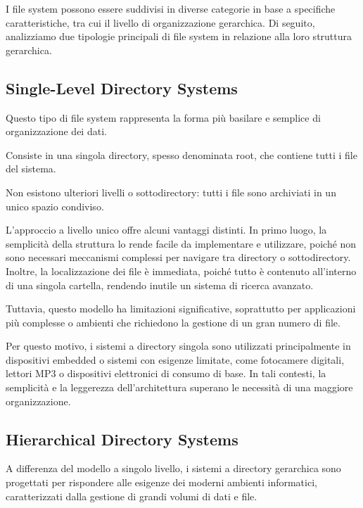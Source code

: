 \documentclass[12pt,a4paper,openright,twoside]{book}
\begin{document}
        I file system possono essere suddivisi in diverse categorie in base a specifiche caratteristiche, tra cui il livello di organizzazione gerarchica. Di seguito, analizziamo due tipologie principali di file system in relazione alla loro struttura gerarchica.

        \subsection{Single-Level Directory Systems}

            Questo tipo di file system rappresenta la forma più basilare e semplice di organizzazione dei dati.

            Consiste in una singola directory, spesso denominata root, che contiene tutti i file del sistema.

            Non esistono ulteriori livelli o sottodirectory: tutti i file sono archiviati in un unico spazio condiviso.

            L'approccio a livello unico offre alcuni vantaggi distinti. In primo luogo, la semplicità della struttura lo rende facile da implementare e utilizzare, poiché non sono necessari meccanismi complessi per navigare tra directory o sottodirectory. Inoltre, la localizzazione dei file è immediata, poiché tutto è contenuto all'interno di una singola cartella, rendendo inutile un sistema di ricerca avanzato.

            Tuttavia, questo modello ha limitazioni significative, soprattutto per applicazioni più complesse o ambienti che richiedono la gestione di un gran numero di file.

            Per questo motivo, i sistemi a directory singola sono utilizzati principalmente in dispositivi embedded o sistemi con esigenze limitate, come fotocamere digitali, lettori MP3 o dispositivi elettronici di consumo di base. In tali contesti, la semplicità e la leggerezza dell'architettura superano le necessità di una maggiore organizzazione.

        \subsection{Hierarchical Directory Systems}

            A differenza del modello a singolo livello, i sistemi a directory gerarchica sono progettati per rispondere alle esigenze dei moderni ambienti informatici, caratterizzati dalla gestione di grandi volumi di dati e file.
\end{document}
